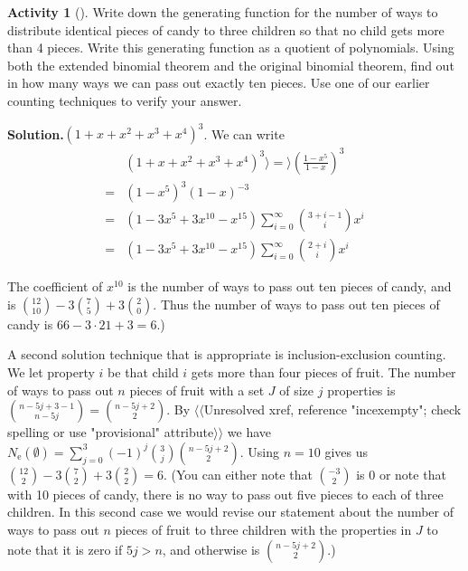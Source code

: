 \documentclass[10pt,]{book}
\theoremstyle{plain}
\theoremstyle{definition}
\newtheorem{activity}[project]{Activity}
\numberwithin{equation}{chapter}
\newcommand{\amp}{&}
\begin{document}
\begin{activity}[]\label{activity-186}
Write down the generating function for the number of ways to distribute identical pieces of candy to three children so that no child gets more than 4 pieces. Write this generating function as a quotient of polynomials. Using both the extended binomial theorem and the original binomial theorem, find out in how many ways we can pass out exactly ten pieces. Use one of our earlier counting techniques to verify your answer.%
\par\medskip\noindent%
\textbf{Solution.}\quad \((1+x+x^2+x^3+x^4)^3\). We can write%
\begin{align*}
\amp (1+x+x^2+x^3+x^4)^3 \rangle =\rangle \left(\frac{1-x^5}{1-x}\right)^3\\
=\amp (1-x^5)^3(1-x)^{-3}\\
=\amp (1-3x^5+3x^{10}-x^{15})\sum_{i=0}^\infty \binom{3+i-1}{i}x^i\\
=\amp (1-3x^5+3x^{10}-x^{15})\sum_{i=0}^\infty \binom{2+i}{i}x^i
\end{align*}
%
\par
The coefficient of \(x^{10}\) is the number of ways to pass out ten pieces of candy, and is \(\binom{12}{10}-3\binom{7}{5} +3\binom{2}{0}\).  Thus the number of ways to pass out ten pieces of candy is \(66-3\cdot21+3=6\).)%
\par
A second solution technique that is appropriate is inclusion-exclusion counting. We let property \(i\) be that child \(i\) gets more than four pieces of fruit. The number of ways to pass out \(n\) pieces of fruit with a set \(J\) of size \(j\) properties is \(\binom{n-5j+3-1}{n-5j}=\binom{n-5j+2}{2}\). By {$\langle\langle$Unresolved xref, reference "incexempty"; check spelling or use "provisional" attribute$\rangle\rangle$} we have \(N_{\mbox{e} }(\emptyset) = \sum_{j=0}^3 (-1)^j\binom{3}{j}\binom{n-5j+2}{2}\). Using \(n=10\) gives us \(\binom{12}{2}-3\binom{7}{2} +3\binom{2}{2} =6.\) (You can either note that \(\binom{-3}{2}\) is 0 or note that with 10 pieces of candy, there is no way to pass out five pieces to each of three children. In this second case we would revise our statement about the number of ways to pass out \(n\) pieces of fruit to three children with the properties in \(J\) to note that it is zero if \(5j>n\), and otherwise is \(\binom{n-5j+2}{2}\).)%
\end{activity}
\end{document}
